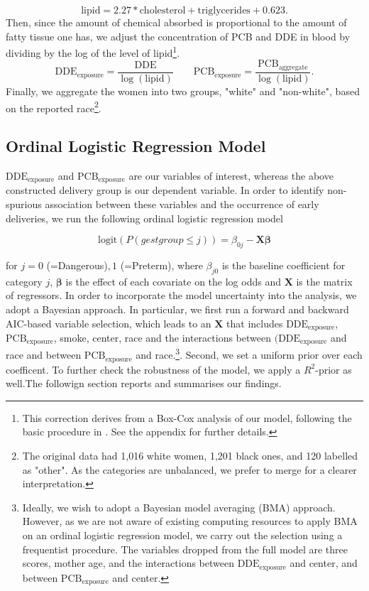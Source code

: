 \documentclass[10pt]{jmlr}%
\begin{document}
\begin{equation}
\label{eq:fat}
\text{lipid} = 2.27 * \text{cholesterol} + \text{triglycerides} + 0.623.
\end{equation}
Then, since the amount of chemical absorbed is proportional to the amount of fatty tissue one has, we adjust the concentration of PCB and DDE in blood by dividing by the log of the level of lipid\footnote{This correction derives from a Box-Cox analysis of our model, following the basic procedure in \cite{Li_Long_Duns}. See the appendix for further details.}.
\begin{equation}
\label{eq:exp_dde_pcb}
\text{DDE}_{\text{exposure}} = \dfrac{\text{DDE}}{\log(\text{lipid})} \qquad \text{PCB}_{\text{exposure}} = \dfrac{\text{PCB}_\text{aggregate}}{\log(\text{lipid})}.
\end{equation}
Finally, we aggregate the women into two groups, "white" and "non-white", based on the reported race\footnote{The original data had 1,016 white women, 1,201 black ones, and 120 labelled as "other". As the categories are unbalanced, we prefer to merge for a clearer interpretation.}.

\subsection{Ordinal Logistic Regression Model}
$\text{DDE}_{\text{exposure}}$ and $\text{PCB}_{\text{exposure}}$ are our variables of interest, whereas the above constructed delivery group is our dependent variable. In order to identify non-spurious association between these variables and the occurrence of early deliveries, we run the following ordinal logistic regression model 

\begin{equation}
\label{eq:ordi_logit}
\text{logit}(P(gestgroup \le j)) = \beta_{0j} - \mathbf{X} \boldsymbol{\beta}
\end{equation}

for $j=0$ (=Dangerous)$,1$ (=Preterm), where $\beta_{j0}$ is the baseline coefficient for category $j$, $\boldsymbol{\beta}$ is the effect of each covariate on the log odds and $\mathbf{X}$ is the matrix of regressors. In order to incorporate the model uncertainty into the analysis, we adopt a Bayesian approach. In particular, we first run a forward and backward AIC-based variable selection, which leads to an $\mathbf{X}$ that includes $\text{DDE}_{\text{exposure}}$, $\text{PCB}_{\text{exposure}}$, smoke, center, race and the interactions between $(\text{DDE}_{\text{exposure}}$ and race and between $\text{PCB}_{\text{exposure}}$ and race.\footnote{Ideally, we wish to adopt a Bayesian model averaging (BMA) approach. However, as we are not aware of existing computing resources to apply BMA on an ordinal logistic regression model, we carry out the selection using a frequentist procedure. The variables dropped from the full model are three scores, mother age, and the interactions between $\text{DDE}_{\text{exposure}}$ and center, and between $\text{PCB}_{\text{exposure}}$ and center.}. Second, we set a uniform prior over each coefficent. To further check the robustness of the model, we apply a $R^2$-prior as well.The followign section reports and summarises our findings.
\end{document}
